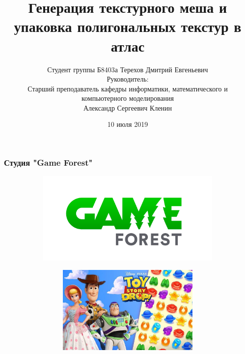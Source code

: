 \documentclass[10pt, unicode]{beamer}
\title{Генерация текстурного меша и упаковка полигональных текстур в атлас}
\author[Терехов Д.Е.]{Студент группы Б8403а Терехов Дмитрий Евгеньевич\\
Руководитель:\\
Старший преподаватель кафедры информатики, математического и компьютерного моделирования\\
Александр Сергеевич Кленин}
\date{10 июля 2019}
\begin{document}
    \begin{frame}[fragile]
        \titlepage
        \thispagestyle{empty}
    \end{frame}
    \begin{frame}
        \frametitle{Студия "Game Forest"}
        \begin{figure}[H]
            \centering
            \begin{subfigure}[l]{0.50\linewidth}
                \centering
                \includegraphics[scale=0.15]{GAMEFOREST.png}
            \end{subfigure}
            \begin{subfigure}{0.49\linewidth}
                \begin{subfigure}{\linewidth}
                    \centering
                    \includegraphics[scale=0.15]{TSD.jpg}
                \end{subfigure}
                \begin{subfigure}{\linewidth}
                    \centering

\end{subfigure}
\end{subfigure}
\end{figure}
\end{frame}
\end{document}
